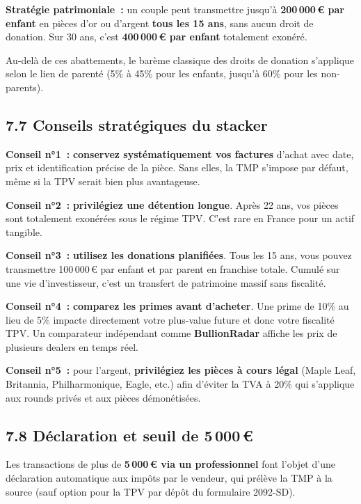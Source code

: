 \documentclass[14pt,a4paper]{extarticle}
\begin{document}
\textbf{Stratégie patrimoniale~:} un couple peut transmettre jusqu'à \textbf{200\,000\,€ par enfant} en pièces d'or ou d'argent \textbf{tous les 15 ans}, sans aucun droit de donation. Sur 30 ans, c'est \textbf{400\,000\,€ par enfant} totalement exonéré.

Au-delà de ces abattements, le barème classique des droits de donation s'applique selon le lien de parenté (5\% à 45\% pour les enfants, jusqu'à 60\% pour les non-parents).

\subsection{7.7 Conseils stratégiques du stacker}

\textbf{Conseil n°1~:} \textbf{conservez systématiquement vos factures} d'achat avec date, prix et identification précise de la pièce. Sans elles, la TMP s'impose par défaut, même si la TPV serait bien plus avantageuse.

\textbf{Conseil n°2~:} \textbf{privilégiez une détention longue}. Après 22 ans, vos pièces sont totalement exonérées sous le régime TPV. C'est rare en France pour un actif tangible.

\textbf{Conseil n°3~:} \textbf{utilisez les donations planifiées}. Tous les 15 ans, vous pouvez transmettre 100\,000\,€ par enfant et par parent en franchise totale. Cumulé sur une vie d'investisseur, c'est un transfert de patrimoine massif sans fiscalité.

\textbf{Conseil n°4~:} \textbf{comparez les primes avant d'acheter}. Une prime de 10\% au lieu de 5\% impacte directement votre plus-value future et donc votre fiscalité TPV. Un comparateur indépendant comme \textbf{BullionRadar} affiche les prix de plusieurs dealers en temps réel.

\textbf{Conseil n°5~:} pour l'argent, \textbf{privilégiez les pièces à cours légal} (Maple Leaf, Britannia, Philharmonique, Eagle, etc.) afin d'éviter la TVA à 20\% qui s'applique aux rounds privés et aux pièces démonétisées.

\subsection{7.8 Déclaration et seuil de 5\,000\,€}

Les transactions de plus de \textbf{5\,000\,€ via un professionnel} font l'objet d'une déclaration automatique aux impôts par le vendeur, qui prélève la TMP à la source (sauf option pour la TPV par dépôt du formulaire 2092-SD).
\end{document}
